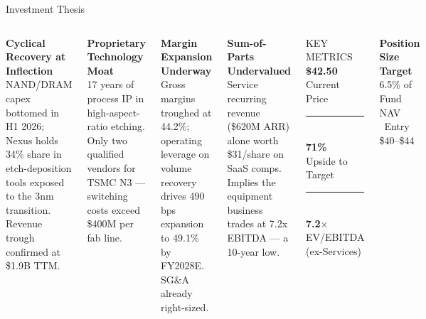 \documentclass[10pt,aspectratio=169]{beamer}
\newcommand{\thesispoint}[2]{%
  \begin{minipage}[t]{0.48\linewidth}
    {\color{gold}\Large\faCaretRight}\hspace{6pt}%
    \begin{minipage}[t]{0.80\linewidth}
      {\color{navy}\bfseries #1}\\[2pt]
      {\footnotesize\color{dtext!80}#2}
    \end{minipage}
  \end{minipage}%
}
\begin{document}
\begin{frame}{Investment Thesis}
  \vspace{-4pt}

  \begin{columns}[T,onlytextwidth]
      \vspace{6pt}
      \thesispoint{Cyclical Recovery at Inflection}{NAND/DRAM capex bottomed in H1 2026; Nexus holds 34\% share in etch-deposition tools exposed to the 3nm transition. Revenue trough confirmed at \$1.9B TTM.}

      \vspace{10pt}
      \thesispoint{Proprietary Technology Moat}{17 years of process IP in high-aspect-ratio etching. Only two qualified vendors for TSMC N3 — switching costs exceed \$400M per fab line.}

      \vspace{10pt}
      \thesispoint{Margin Expansion Underway}{Gross margins troughed at 44.2\%; operating leverage on volume recovery drives 490 bps expansion to 49.1\% by FY2028E. SG\&A already right-sized.}

      \vspace{10pt}
      \thesispoint{Sum-of-Parts Undervalued}{Service recurring revenue (\$620M ARR) alone worth \$31/share on SaaS comps. Implies the equipment business trades at 7.2x EBITDA — a 10-year low.}

      \vspace{8pt}
      \begin{statbox}
        \centering
        {\footnotesize KEY METRICS}\\[6pt]
        {\fontsize{18}{22}\bfseries\$42.50}\\[1pt]
        {\footnotesize Current Price}\\[10pt]
        \textcolor{gold}{\rule{40pt}{0.6pt}}\\[8pt]
        {\fontsize{13}{16}\bfseries 71\%}\\[1pt]
        {\footnotesize Upside to Target}\\[10pt]
        \textcolor{gold}{\rule{40pt}{0.6pt}}\\[8pt]
        {\fontsize{13}{16}\bfseries 7.2$\times$}\\[1pt]
        {\footnotesize EV/EBITDA (ex-Services)}
      \end{statbox}

      \vspace{8pt}
      \begin{calloutbox}
        \centering
        {\footnotesize\bfseries\color{navy}Position Size Target}\\[2pt]
        {\color{dtext}\scriptsize 6.5\% of Fund NAV \textbar\ Entry \$40–\$44}
      \end{calloutbox}
  \end{columns}

\end{frame}
\end{document}
